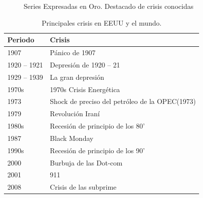\documentclass[a4paper]{article}
\begin{document}
\begin{figure}[H]
	\centering
	\caption{Series Expresadas en Oro. Destacado de crisis conocidas} \label{fig:series_crisis}
\end{figure}



\begin{table}[ht]
	\centering
	\begin{tabular}{ll}
		\hline
		Periodo & Crisis \\ 
		\hline
		1907 & Pánico de 1907 \\ 
		1920 – 1921 & Depresión de 1920 – 21 \\ 
		1929 – 1939 & La gran depresión \\ 
		1970s & 1970s Crisis Energética \\ 
		1973 & Shock de preciso del petróleo de la OPEC(1973) \\ 
		1979 & Revolución Iraní\\ 
		1980s & Recesión de principio de los 80'\\ 
		1987 & Black Monday \\ 
		1990s & Recesión de principio de los 90'\\ 
		2000 & Burbuja de las Dot-com \\ 
		2001 & 911 \\ 
		2008 & Crisis de las subprime \\ 
		\hline
	\end{tabular}
\caption{Principales crisis en EEUU y el mundo.}
\label{tabla_crisis}
\end{table}
\end{document}
